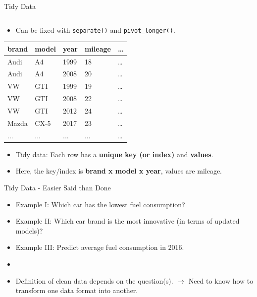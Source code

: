 \documentclass[12pt,aspectratio=169]{beamer}
\begin{document}
\begin{frame}{Tidy Data}
{\begin{table}[]
\begin{tabular}{lll}
\end{tabular}
\end{table}
\begin{itemize}
    \item Can be fixed with \texttt{separate()} and \texttt{pivot\_longer()}. 
\end{itemize}
}
{
\begin{table}[]
\begin{tabular}{lll|ll}
\textbf{brand} & \textbf{model} & \textbf{year} & mileage & \dots \\
\hline
Audi  & A4    & 1999 & 18 & \dots     \\
Audi  & A4    & 2008 & 20 & \dots     \\
VW    & GTI   & 1999 & 19 & \dots     \\
VW    & GTI   & 2008 & 22 & \dots     \\
VW    & GTI   & 2012 & 24 & \dots     \\
Mazda & CX-5  & 2017 & 23 & \dots     \\
...   & ...   & ...  & ...& \dots  
\end{tabular}
\end{table}
\begin{itemize}
    \item Tidy data: Each row has a \textbf{unique key (or index)} and \textbf{values}.
    \item Here, the key/index is \textbf{brand x model x year}, values are mileage.
\end{itemize}
}
\end{frame}

\begin{frame}{Tidy Data - Easier Said than Done}
    \begin{itemize}
        \item<1-> Example I: Which car has the lowest fuel consumption?
        \item<2-> Example II: Which car brand is the most innovative (in terms of updated models)?
        \item<3-> Example III: Predict average fuel consumption in 2016.
        \item<4->[]
        \item<4-> Definition of clean data depends on the question(s). $\rightarrow$ Need to know how to transform one data format into another.
    \end{itemize}
\end{frame}
\end{document}
